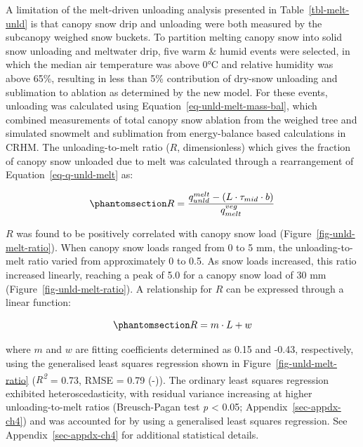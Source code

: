 \documentclass[
  letterpaper,
]{tex/uofsthesis-cs}
\begin{document}
A limitation of the melt-driven unloading analysis presented in
Table~\ref{tbl-melt-unld} is that canopy snow drip and unloading were
both measured by the subcanopy weighed snow buckets. To partition
melting canopy snow into solid snow unloading and meltwater drip, five
warm \& humid events were selected, in which the median air temperature
was above 0°C and relative humidity was above 65\%, resulting in less
than 5\% contribution of dry-snow unloading and sublimation to ablation
as determined by the new model. For these events, unloading was
calculated using Equation~\ref{eq-unld-melt-mass-bal}, which combined
measurements of total canopy snow ablation from the weighed tree and
simulated snowmelt and sublimation from energy-balance based
calculations in CRHM. The unloading-to-melt ratio (\(R\), dimensionless)
which gives the fraction of canopy snow unloaded due to melt was
calculated through a rearrangement of Equation~\ref{eq-q-unld-melt} as:

\begin{equation}\phantomsection\label{eq-melt-unld-ratio}{
R = \frac{q_{unld}^{melt} - (L \cdot \tau_{mid} \cdot b)}{q_{melt}^{veg}}
}\end{equation}

\(R\) was found to be positively correlated with canopy snow load
(Figure~\ref{fig-unld-melt-ratio}). When canopy snow loads ranged from 0
to 5 mm, the unloading-to-melt ratio varied from approximately 0 to 0.5.
As snow loads increased, this ratio increased linearly, reaching a peak
of 5.0 for a canopy snow load of 30 mm
(Figure~\ref{fig-unld-melt-ratio}). A relationship for \(R\) can be
expressed through a linear function:

\begin{equation}\phantomsection\label{eq-fm}{
R = m \cdot L + w
}\end{equation}

where \(m\) and \(w\) are fitting coefficients determined as 0.15 and
-0.43, respectively, using the generalised least squares regression
shown in Figure~\ref{fig-unld-melt-ratio} (\emph{R\textsuperscript{2}} =
0.73, RMSE = 0.79 (-)). The ordinary least squares regression exhibited
heteroscedasticity, with residual variance increasing at higher
unloading-to-melt ratios (Breusch-Pagan test \emph{p} \textless{} 0.05;
Appendix~\ref{sec-appdx-ch4}) and was accounted for by using a
generalised least squares regression. See Appendix~\ref{sec-appdx-ch4}
for additional statistical details.
\end{document}
